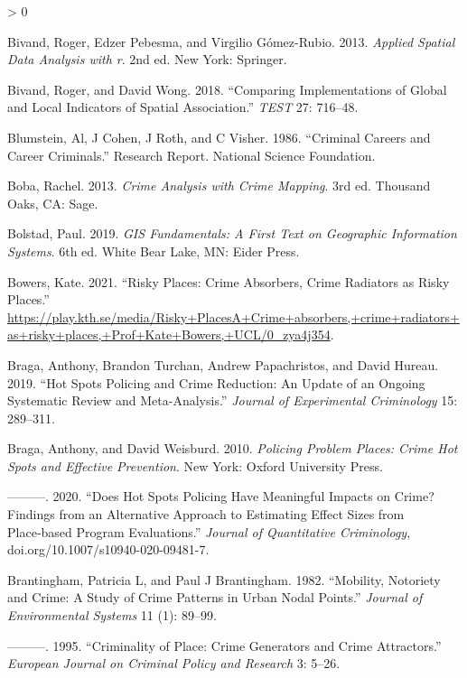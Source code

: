 \documentclass[
  krantz2]{krantz}
\newlength{\cslhangindent}
\newenvironment{CSLReferences}[2] %
 {%
  \setlength{\parindent}{0pt}
  \ifodd #1 \everypar{\setlength{\hangindent}{\cslhangindent}}\ignorespaces\fi
  \ifnum #2 > 0
  \setlength{\parskip}{#2\baselineskip}
  \fi
 }%
 {}
\begin{document}
\begin{CSLReferences}{1}{0}
\leavevmode\hypertarget{ref-Bivand_2013}{}%
Bivand, Roger, Edzer Pebesma, and Virgilio Gómez-Rubio. 2013. \emph{Applied Spatial Data Analysis with r}. 2nd ed. New York: Springer.

\leavevmode\hypertarget{ref-Bivand_2018}{}%
Bivand, Roger, and David Wong. 2018. {``Comparing Implementations of Global and Local Indicators of Spatial Association.''} \emph{TEST} 27: 716--48.

\leavevmode\hypertarget{ref-Blumstein_1986}{}%
Blumstein, Al, J Cohen, J Roth, and C Visher. 1986. {``Criminal Careers and Career Criminals.''} Research Report. National Science Foundation.

\leavevmode\hypertarget{ref-Boba_2013}{}%
Boba, Rachel. 2013. \emph{Crime Analysis with Crime Mapping}. 3rd ed. Thousand Oaks, CA: Sage.

\leavevmode\hypertarget{ref-Bolstad_2019}{}%
Bolstad, Paul. 2019. \emph{GIS Fundamentals: A First Text on Geographic Information Systems}. 6th ed. White Bear Lake, MN: Eider Press.

\leavevmode\hypertarget{ref-Bowers_2021}{}%
Bowers, Kate. 2021. {``Risky Places: Crime Absorbers, Crime Radiators as Risky Places.''} \url{https://play.kth.se/media/Risky+PlacesA+Crime+absorbers,+crime+radiators+as+risky+places,+Prof+Kate+Bowers,+UCL/0_zya4j354}.

\leavevmode\hypertarget{ref-Braga_2019}{}%
Braga, Anthony, Brandon Turchan, Andrew Papachristos, and David Hureau. 2019. {``Hot Spots Policing and Crime Reduction: An Update of an Ongoing Systematic Review and Meta-Analysis.''} \emph{Journal of Experimental Criminology} 15: 289--311.

\leavevmode\hypertarget{ref-Braga_2010}{}%
Braga, Anthony, and David Weisburd. 2010. \emph{Policing Problem Places: Crime Hot Spots and Effective Prevention}. New York: Oxford University Press.

\leavevmode\hypertarget{ref-Braga_2020}{}%
---------. 2020. {``Does Hot Spots Policing Have Meaningful Impacts on Crime? Findings from an Alternative Approach to Estimating Effect Sizes from Place‑based Program Evaluations.''} \emph{Journal of Quantitative Criminology}, doi.org/10.1007/s10940-020-09481-7.

\leavevmode\hypertarget{ref-Brantingham_1982}{}%
Brantingham, Patricia L, and Paul J Brantingham. 1982. {``Mobility, Notoriety and Crime: A Study of Crime Patterns in Urban Nodal Points.''} \emph{Journal of Environmental Systems} 11 (1): 89--99.

\leavevmode\hypertarget{ref-Brantingham_1995}{}%
---------. 1995. {``Criminality of Place: Crime Generators and Crime Attractors.''} \emph{European Journal on Criminal Policy and Research} 3: 5--26.


\end{CSLReferences}
\end{document}
